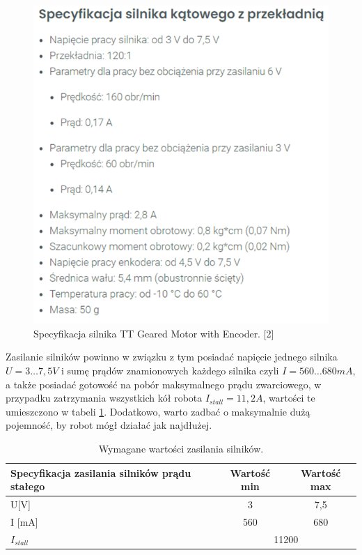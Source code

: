 \documentclass{report}
\begin{document}
\begin{figure}[H]
    \centering
    \includegraphics{src/tech_specifications/TT Geared Motor with Encoder.png}
    \caption{Specyfikacja silnika TT Geared Motor with Encoder. [2]}
    \label{fig:motor-spec}
\end{figure}

Zasilanie silników powinno w związku z tym posiadać napięcie jednego silnika $U=3\ldots7,5 V$ i sumę 
prądów znamionowych każdego silnika czyli $I=560\ldots680 mA$, a także posiadać gotowość na pobór 
maksymalnego prądu zwarciowego, w przypadku zatrzymania wszystkich kół robota $I_{stall}=11,2 A$, 
wartości te umieszczono w tabeli \ref{tab:motors-power}. Dodatkowo, warto zadbać o maksymalnie dużą pojemność, by robot mógł działać jak najdłużej.


\begin{table}[H]
\centering
    \begin{tabular}{|m{10em}|cc|}
    \hline
    Specyfikacja zasilania silników prądu stałego & \multicolumn{1}{c|}{Wartość min} & Wartość max \\ \hline
    U{[}V{]}                                      & \multicolumn{1}{c|}{3}           & 7,5         \\ \hline
    I {[}mA{]}                                    & \multicolumn{1}{c|}{560}         & 680         \\ \hline
    $I_{stall}$                                   & \multicolumn{2}{c|}{11200}                     \\ \hline
    \end{tabular}
    \caption{Wymagane wartości zasilania silników.}
    \label{tab:motors-power}
\end{table}
\end{document}
